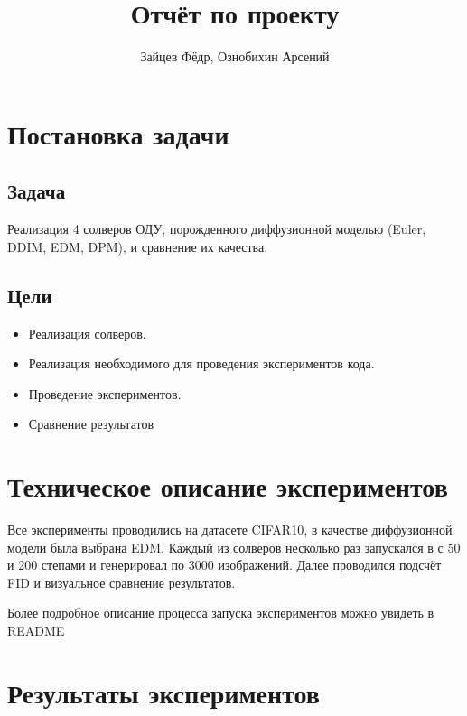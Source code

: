 \documentclass[a4paper]{article}
\title{Отчёт по проекту}
\author{Зайцев Фёдр, Ознобихин Арсений}
\begin{document}
    \maketitle{}
    \tableofcontents
    \newpage

    \section{Постановка задачи}
    \subsection{Задача}
    Реализация 4 солверов ОДУ, порожденного диффузионной моделью (Euler, DDIM, EDM, DPM),
    и сравнение их качества.

    \subsection{Цели}
    \begin{itemize}
        \item Реализация солверов.
        \item Реализация необходимого для проведения экспериментов кода.
        \item Проведение экспериментов.
        \item Сравнение результатов
    \end{itemize}


    \section{Техническое описание экспериментов}
    Все эксперименты проводились на датасете CIFAR10, в качестве диффузионной модели была выбрана
    EDM. Каждый из солверов несколько раз запускался в с 50 и 200 степами и генерировал по 3000
    изображений. Далее проводился подсчёт FID и визуальное сравнение результатов.
    \par Более подробное описание процесса запуска экспериментов можно увидеть в
    \href{https://github.com/ARS404/DiffusionProject}{README}


    \section{Результаты экспериментов}
\end{document}

